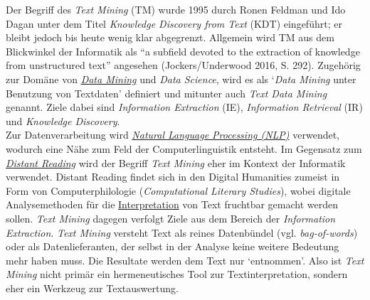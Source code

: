 \documentclass{article}
\begin{document}
    Der Begriff des \emph{Text Mining} (TM) wurde 1995 durch Ronen Feldman und Ido Dagan unter dem Titel \emph{Knowledge Discovery from Text} (KDT) eingeführt; er bleibt jedoch bis heute wenig klar abgegrenzt. Allgemein wird TM aus dem Blickwinkel der Informatik als “a subfield devoted to the extraction of knowledge from unstructured text” angesehen (Jockers/Underwood 2016, S. 292). Zugehörig zur Domäne von \emph{\href{http://gams.uni-graz.at/o:konde.48}{Data Mining}} und \emph{Data Science}, wird es als ‘\emph{Data Mining} unter Benutzung von Textdaten’ definiert und mitunter auch \emph{Text Data Mining} genannt. Ziele dabei sind \emph{Information Extraction} (IE), \emph{Information Retrieval} (IR) und \emph{Knowledge Discovery}. \\
            
        Zur Datenverarbeitung wird \emph{\href{http://gams.uni-graz.at/o:konde.145}{Natural Language Processing (NLP)}} verwendet, wodurch eine Nähe zum Feld der Computerlinguistik entsteht. Im Gegensatz zum \emph{\href{http://gams.uni-graz.at/o:konde.71}{Distant Reading}} wird der Begriff \emph{Text Mining} eher im Kontext der Informatik verwendet. Distant Reading findet sich in den Digital Humanities zumeist in Form von Computerphilologie (\emph{Computational Literary Studies}), wobei digitale Analysemethoden für die \href{http://gams.uni-graz.at/o:konde.100}{Interpretation} von Text fruchtbar gemacht werden sollen. \emph{Text Mining} dagegen verfolgt Ziele aus dem Bereich der \emph{Information Extraction}. \emph{Text Mining} versteht Text als reines Datenbündel (vgl. \emph{bag-of-words}) oder als Datenlieferanten, der selbst in der Analyse keine weitere Bedeutung mehr haben muss. Die Resultate werden dem Text nur ‘entnommen’. Also ist \emph{Text Mining} nicht primär ein hermeneutisches Tool zur Textinterpretation, sondern eher ein Werkzeug zur Textauswertung. \\
            
\end{document}

